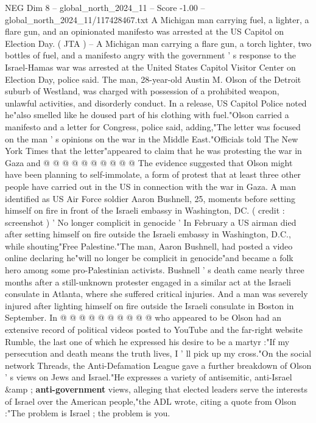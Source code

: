 \begin{textsample}{NEG Dim 8 – global\_north\_2024\_11 – Score -1.00 – global\_north\_2024\_11/117428467.txt}  \label{ex:f8_neg_397}
A Michigan man carrying fuel, a lighter, a flare gun, and an opinionated manifesto was arrested at the US Capitol on Election Day. ( JTA ) -- A Michigan man carrying a flare gun, a torch lighter, two bottles of fuel, and a manifesto angry with the government ' s response to the Israel-Hamas war was arrested at the United States Capitol Visitor Center on Election Day, police said.
The man, 28-year-old Austin M.
Olson of the Detroit suburb of Westland, was charged with possession of a prohibited weapon, unlawful activities, and disorderly conduct.
In a release, US Capitol Police noted he"also smelled like he doused part of his clothing with fuel."Olson carried a manifesto and a letter for Congress, police said, adding,"The letter was focused on the man ' s opinions on the war in the Middle East."Officials told The New York Times that the letter"appeared to claim that he was protesting the war in Gaza and @ @ @ @ @ @ @ @ @ @ The evidence suggested that Olson might have been planning to self-immolate, a form of protest that at least three other people have carried out in the US in connection with the war in Gaza.
A man identified as US Air Force soldier Aaron Bushnell, 25, moments before setting himself on fire in front of the Israeli embassy in Washington, DC. ( credit : screenshot ) ' No longer complicit in genocide ' In February a US airman died after setting himself on fire outside the Israeli embassy in Washington, D.C., while shouting"Free Palestine."The man, Aaron Bushnell, had posted a video online declaring he"will no longer be complicit in genocide"and became a folk hero among some pro-Palestinian activists.
Bushnell ' s death came nearly three months after a still-unknown protester engaged in a similar act at the Israeli consulate in Atlanta, where she suffered critical injuries.
And a man was severely injured after lighting himself on fire outside the Israeli consulate in Boston in September.
In @ @ @ @ @ @ @ @ @ @ who appeared to be Olson had an extensive record of political videos posted to YouTube and the far-right website Rumble, the last one of which he expressed his desire to be a martyr :"If my persecution and death means the truth lives, I ' ll pick up my cross."On the social network Threads, the Anti-Defamation League gave a further breakdown of Olson ' s views on Jews and Israel."He expresses a variety of antisemitic, anti-Israel \&amp ; \textbf{anti-government} views, alleging that elected leaders serve the interests of Israel over the American people,"the ADL wrote, citing a quote from Olson :"The problem is Israel ; the problem is you.

\end{textsample}
